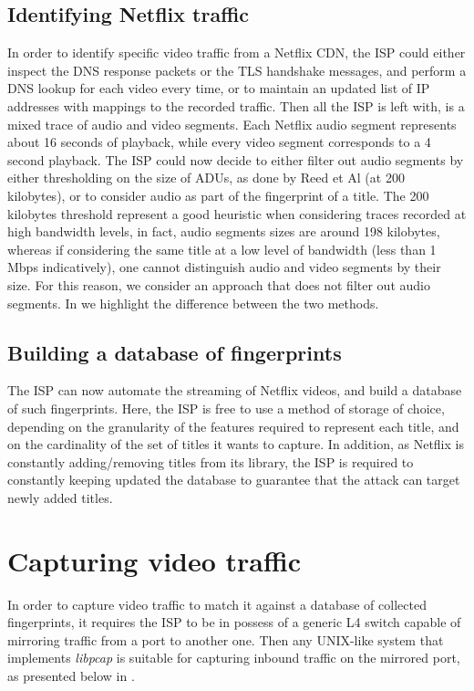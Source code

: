 \subsection{Identifying Netflix traffic}\label{dns}

In order to identify specific video traffic from a Netflix CDN, the ISP could
either inspect the DNS response packets or the TLS handshake messages, and
perform a DNS lookup for each video every time, or to maintain an updated list
of IP addresses with mappings to the recorded traffic. Then all the ISP is left
with, is a mixed trace of audio and video segments. Each Netflix audio segment
represents about 16 seconds of playback, while every video segment corresponds
to a 4 second playback. The ISP could now decide to either filter out audio
segments by either thresholding on the size of ADUs, as done by Reed et Al (at
200 kilobytes), or to consider audio as part of the fingerprint of a title. The
200 kilobytes threshold represent a good heuristic when considering traces
recorded at high bandwidth levels, in fact, audio segments sizes are around 198
kilobytes, whereas if considering the same title at a low level of bandwidth
(less than 1 Mbps indicatively), one cannot distinguish audio and video
segments by their size. For this reason, we consider an approach that does not
filter out audio segments. In  we highlight the difference
between the two methods.

\subsection{Building a database of fingerprints}

The ISP can now automate the streaming of Netflix videos, and build a database
of such fingerprints. Here, the ISP is free to use a method of storage of
choice, depending on the granularity of the features required to represent each
title, and on the cardinality of the set of titles it wants to capture.  In
addition, as Netflix is constantly adding/removing titles from its library, the
ISP is required to constantly keeping updated the database to guarantee that
the attack can target newly added titles.

\section{Capturing video traffic}

In order to capture video traffic to match it against a database of collected
fingerprints, it requires the ISP to be in possess of a generic L4 switch
capable of mirroring traffic from a port to another one. Then any UNIX-like
system that implements \emph{libpcap} is suitable for capturing inbound traffic
on the mirrored port, as presented below in .

